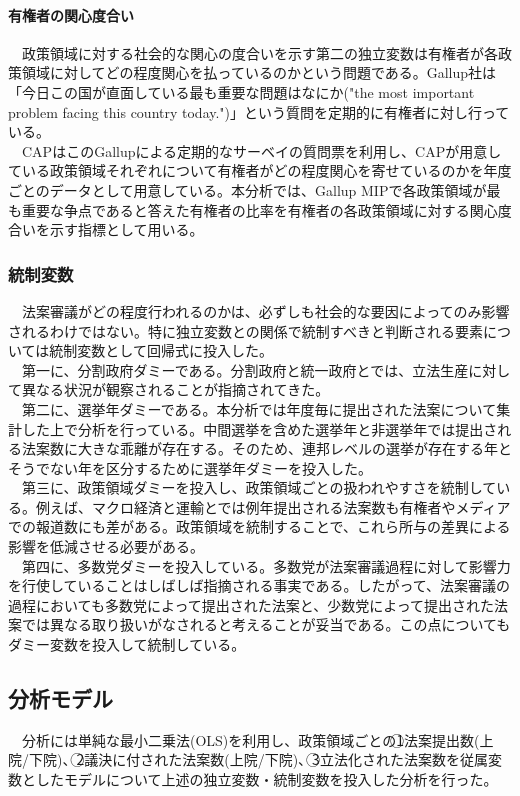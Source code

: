 \documentclass[here]{article}
\begin{document}
\paragraph*{有権者の関心度合い}
　政策領域に対する社会的な関心の度合いを示す第二の独立変数は有権者が各政策領域に対してどの程度関心を払っているのかという問題である。Gallup社は「今日この国が直面している最も重要な問題はなにか("the most important problem facing this country today.")」という質問を定期的に有権者に対し行っている。\citep*{Gallup_Inc2006-vs}\\
　CAPはこのGallupによる定期的なサーベイの質問票を利用し、CAPが用意している政策領域それぞれについて有権者がどの程度関心を寄せているのかを年度ごとのデータとして用意している。本分析では、Gallup MIPで各政策領域が最も重要な争点であると答えた有権者の比率を有権者の各政策領域に対する関心度合いを示す指標として用いる。\\

\subsubsection{統制変数}
　法案審議がどの程度行われるのかは、必ずしも社会的な要因によってのみ影響されるわけではない。特に独立変数との関係で統制すべきと判断される要素については統制変数として回帰式に投入した。\\
　第一に、分割政府ダミーである。分割政府と統一政府とでは、立法生産に対して異なる状況が観察されることが指摘されてきた。\\
　第二に、選挙年ダミーである。本分析では年度毎に提出された法案について集計した上で分析を行っている。中間選挙を含めた選挙年と非選挙年では提出される法案数に大きな乖離が存在する。そのため、連邦レベルの選挙が存在する年とそうでない年を区分するために選挙年ダミーを投入した。\\
　第三に、政策領域ダミーを投入し、政策領域ごとの扱われやすさを統制している。例えば、マクロ経済と運輸とでは例年提出される法案数も有権者やメディアでの報道数にも差がある。政策領域を統制することで、これら所与の差異による影響を低減させる必要がある。\\
　第四に、多数党ダミーを投入している。多数党が法案審議過程に対して影響力を行使していることはしばしば指摘される事実である。\citep*{Rohde1991-da,Aldrich1995-xf,Cox2005-pn,Cox2007-xq}したがって、法案審議の過程においても多数党によって提出された法案と、少数党によって提出された法案では異なる取り扱いがなされると考えることが妥当である。この点についてもダミー変数を投入して統制している。\\
\subsection{分析モデル}
　分析には単純な最小二乗法(OLS)を利用し、政策領域ごとの\textcircled{\scriptsize 1}法案提出数(上院/下院)、\textcircled{\scriptsize 2}議決に付された法案数(上院/下院)、\textcircled{\scriptsize 3}立法化された法案数を従属変数としたモデルについて上述の独立変数・統制変数を投入した分析を行った。\\
\end{document}

